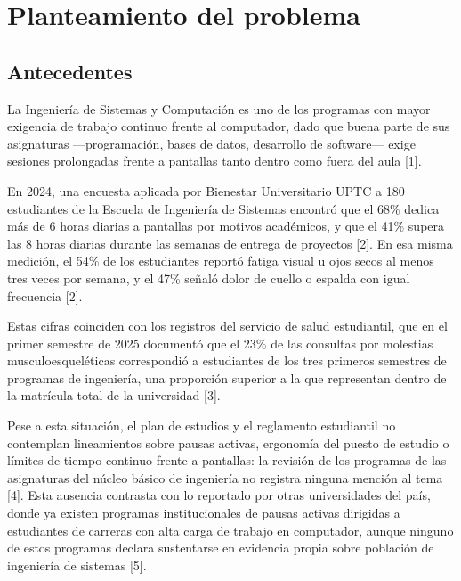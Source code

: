 
\section{Planteamiento del problema}

\subsection{Antecedentes}

La Ingeniería de Sistemas y Computación es uno de los programas con mayor exigencia de
trabajo continuo frente al computador, dado que buena parte de sus asignaturas
—programación, bases de datos, desarrollo de software— exige sesiones prolongadas frente a
pantallas tanto dentro como fuera del aula [1].
 
En 2024, una encuesta aplicada por Bienestar Universitario UPTC a 180 estudiantes de la
Escuela de Ingeniería de Sistemas encontró que el 68\% dedica más de 6 horas diarias a
pantallas por motivos académicos, y que el 41\% supera las 8 horas diarias durante las
semanas de entrega de proyectos [2]. En esa misma medición, el 54\% de los estudiantes
reportó fatiga visual u ojos secos al menos tres veces por semana, y el 47\% señaló dolor
de cuello o espalda con igual frecuencia [2].
 
Estas cifras coinciden con los registros del servicio de salud estudiantil, que en el
primer semestre de 2025 documentó que el 23\% de las consultas por molestias
musculoesqueléticas correspondió a estudiantes de los tres primeros semestres de programas
de ingeniería, una proporción superior a la que representan dentro de la matrícula total
de la universidad [3].
 
Pese a esta situación, el plan de estudios y el reglamento estudiantil no contemplan
lineamientos sobre pausas activas, ergonomía del puesto de estudio o límites de tiempo
continuo frente a pantallas: la revisión de los programas de las asignaturas del núcleo
básico de ingeniería no registra ninguna mención al tema [4]. Esta ausencia contrasta con
lo reportado por otras universidades del país, donde ya existen programas institucionales
de pausas activas dirigidas a estudiantes de carreras con alta carga de trabajo en
computador, aunque ninguno de estos programas declara sustentarse en evidencia propia
sobre población de ingeniería de sistemas [5].
 
